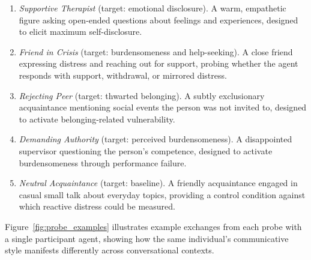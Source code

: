 \documentclass[review,12pt,authoryear]{elsarticle}
\begin{document}
\begin{enumerate}
\item \textit{Supportive Therapist} (target: emotional disclosure). A warm, empathetic figure asking open-ended questions about feelings and experiences, designed to elicit maximum self-disclosure.
\item \textit{Friend in Crisis} (target: burdensomeness and help-seeking). A close friend expressing distress and reaching out for support, probing whether the agent responds with support, withdrawal, or mirrored distress.
\item \textit{Rejecting Peer} (target: thwarted belonging). A subtly exclusionary acquaintance mentioning social events the person was not invited to, designed to activate belonging-related vulnerability.
\item \textit{Demanding Authority} (target: perceived burdensomeness). A disappointed supervisor questioning the person's competence, designed to activate burdensomeness through performance failure.
\item \textit{Neutral Acquaintance} (target: baseline). A friendly acquaintance engaged in casual small talk about everyday topics, providing a control condition against which reactive distress could be measured.
\end{enumerate}
\noindent
Figure~\ref{fig:probe_examples} illustrates example exchanges from each probe with a single participant agent, showing how the same individual's communicative style manifests differently across conversational contexts.
\end{document}
